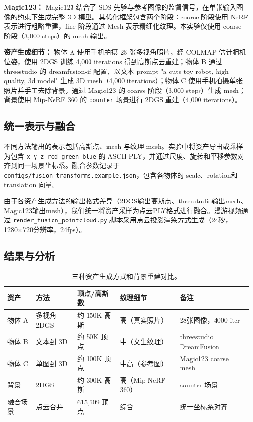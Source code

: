 \documentclass[12pt,a4paper,fontset=fandol]{ctexart}
\begin{document}
\textbf{Magic123：} Magic123 结合了 SDS 先验与参考图像的监督信号，在单张输入图像的约束下生成完整 3D 模型。其优化框架包含两个阶段：coarse 阶段使用 NeRF 表示进行粗略重建，fine 阶段通过 Mesh 表示精细化纹理。本实验仅使用 coarse 阶段（3,000 steps）的 mesh 输出。

\textbf{资产生成细节：} 物体 A 使用手机拍摄 28 张多视角照片，经 COLMAP 估计相机位姿，使用 2DGS 训练 4,000 iterations 得到高斯点云重建；物体 B 通过 threestudio 的 dreamfusion-if 配置，以文本 prompt "a cute toy robot, high quality, 3d model" 生成 3D mesh（4,000 iterations）；物体 C 使用手机拍摄单张照片并手工去除背景，通过 Magic123 的 coarse 阶段（3,000 steps）生成 mesh；背景使用 Mip-NeRF 360 的 \texttt{counter} 场景进行 2DGS 重建（4,000 iterations）。

\subsection{统一表示与融合}
不同方法输出的表示包括高斯点、mesh 与纹理 mesh。实验中将资产导出或采样为包含 \texttt{x y z red green blue} 的 ASCII PLY，并通过尺度、旋转和平移参数对齐到同一场景坐标系。融合参数记录于 \texttt{configs/fusion\_transforms.example.json}，包含各物体的 scale、rotation和 translation 向量。

由于各资产生成方法的输出格式差异（2DGS输出高斯点、threestudio输出mesh、Magic123输出mesh），我们统一将资产采样为点云PLY格式进行融合。漫游视频通过 \texttt{render\_fusion\_pointcloud.py} 脚本采用点云投影渲染方式生成（24秒，1280×720分辨率，24fps）。

\subsection{结果与分析}

\begin{table}[H]
\centering
\begin{tabular}{lllll}
\toprule
资产 & 方法 & 顶点/高斯数 & 纹理细节 & 备注 \\
\midrule
物体 A & 多视角 2DGS & 约 150K 高斯 & 高（真实照片） & 28张图像，4000 iter \\
物体 B & 文本到 3D & 约 50K 顶点 & 中（文生纹理） & threestudio DreamFusion \\
物体 C & 单图到 3D & 约 100K 顶点 & 中高（参考图） & Magic123 coarse mesh \\
背景 & 2DGS & 约 300K 高斯 & 高（Mip-NeRF 360） & counter 场景 \\
\midrule
融合场景 & 点云合并 & 615,609 顶点 & 综合 & 统一坐标系对齐 \\
\bottomrule
\end{tabular}
\caption{三种资产生成方式和背景重建对比。}
\label{tab:assets}
\end{table}
  
\end{document}
